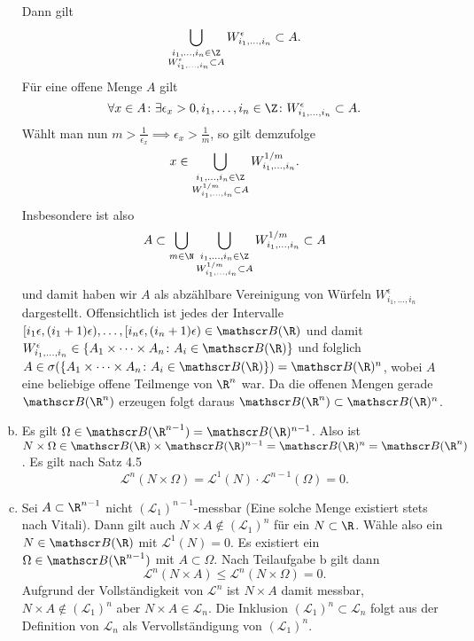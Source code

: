 \documentclass{article}
\begin{document}
\begin{enumerate}[(a)]
        Dann gilt 
        \[
            \bigcup_{\substack{i_1, \dots, i_n \in \Z\\W_{i_1, \dots, i_n}^\epsilon \subset A}} W_{i_1,\dots, i_n}^\epsilon \subset A. 
        \]
        Für eine offene Menge $A$ gilt
        \[
            \forall x\in A\colon \exists \epsilon_x > 0, i_1, \dots, i_n \in \Z\colon W_{i_1, \dots, i_n}^\epsilon \subset A.  
        \]
        Wählt man nun $m > \frac{1}{\epsilon_x} \implies \epsilon_x > \frac{1}{m}$, so gilt demzufolge
        \[
            x \in \bigcup_{\substack{i_1, \dots, i_n \in \Z\\W_{i_1, \dots, i_n}^{1/m} \subset A}} W_{i_1,\dots, i_n}^{1/m}.
        \]
        Insbesondere ist also 
        \[
            A \subset \bigcup_{m \in \N} \bigcup_{\substack{i_1, \dots, i_n \in \Z\\W_{i_1, \dots, i_n}^{1/m} \subset A}} W_{i_1,\dots, i_n}^{1/m} \subset A
        \]
        und damit haben wir $A$ als abzählbare Vereinigung von Würfeln $W_{i_1, \dots, i_n}^\epsilon$ dargestellt. Offensichtlich ist jedes der Intervalle $[i_1\epsilon, (i_1 +1)\epsilon),  \dots,  [i_n\epsilon, (i_n+1)\epsilon) \in \mathscr B(\R)$ und damit $W_{i_1, \dots, i_n}^\epsilon \in \{A_1 \times \dots \times A_n \colon A_i \in \mathscr B(\R)\}$ und folglich $A \in \sigma(\{A_1 \times \dots \times A_n \colon A_i \in \mathscr B(\R)\}) = \mathscr B(\R)^n$, wobei $A$ eine beliebige offene Teilmenge von $\R^n$ war. Da die offenen Mengen gerade $\mathscr B(\R^n)$ erzeugen folgt daraus $\mathscr B(\R^n) \subset \mathscr B(\R)^n$.
        \item Es gilt $\Omega \in \mathscr B(\R^{n-1}) = \mathscr B(\R)^{n-1}$. Also ist $N \times \Omega \in \mathscr B(\R) \times \mathscr B(\R)^{n-1} = \mathscr B(\R)^n = \mathscr B(\R^n)$. Es gilt nach Satz 4.5
        \[
            \mathscr L^n(N \times \Omega) = \mathscr L^1(N) \cdot \mathscr L^{n-1}(\Omega) = 0. 
        \]
        \item Sei $A \subset \R^{n-1}$ nicht $(\mathscr L_1)^{n-1}$-messbar (Eine solche Menge existiert stets nach Vitali). Dann gilt auch $N \times A \notin (\mathscr L_1)^n$ für ein $N \subset \R$. Wähle also ein $N \in \mathscr B(\R)$ mit $\mathscr L^1(N) = 0$. Es existiert ein $\Omega \in \mathscr B(\R^{n-1})$ mit $A \subset \Omega$. Nach Teilaufgabe b gilt dann
        \[
            \mathscr L^n(N \times A) \leq \mathscr L^n(N \times \Omega) = 0.
        \]
        Aufgrund der Vollständigkeit von $\mathscr L^n$ ist $N\times A$ damit messbar, $N\times A \notin (\mathscr L_1)^n$ aber $N\times A \in \mathscr L_n$.
        Die Inklusion $(\mathscr L_1)^n \subset \mathscr L_n$ folgt aus der Definition von $\mathscr L_n$ als Vervollständigung von $(\mathscr L_1)^n$.
    \end{enumerate}
\end{document}
